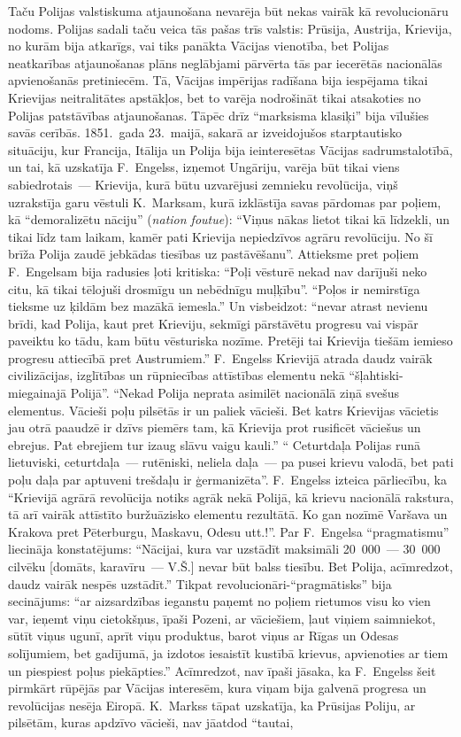 \documentclass[twoside,a5paper,12pt,fleqn,openany]{extbook}
\newcommand{\frtxti}[1]{\textit{\textfrench{#1}}}
\begin{document}
Taču Polijas valstiskuma atjaunošana nevarēja būt nekas vairāk kā revolucionāru nodoms. Polijas sadali taču veica tās pašas trīs valstis: Prūsija, Austrija, Krievija, no kurām bija atkarīgs, vai tiks panākta Vācijas vienotība, bet Polijas neatkarības atjaunošanas plāns neglābjami pārvērta tās par iecerētās nacionālās apvienošanās pretiniecēm. Tā, Vācijas impērijas radīšana bija iespējama tikai Krievijas neitralitātes apstākļos, bet to varēja nodrošināt tikai atsakoties no Polijas patstāvības atjaunošanas. Tāpēc drīz ``marksisma klasiķi'' bija vīlušies savās cerībās. 1851.~gada 23.~maijā, sakarā ar izveidojušos starptautisko situāciju, kur Francija, Itālija un Polija bija ieinteresētas Vācijas sadrumstalotībā, un tai, kā uzskatīja F.~Engelss, izņemot Ungāriju, varēja būt tikai viens sabiedrotais~--- Krievija, kurā būtu uzvarējusi zemnieku revolūcija, viņš uzrakstīja garu vēstuli K.~Marksam, kurā izklāstīja savas pārdomas par poļiem, kā ``demoralizētu nāciju'' (\frtxti{nation foutue}): ``Viņus nākas lietot tikai kā līdzekli, un tikai līdz tam laikam, kamēr pati Krievija nepiedzīvos agrāru revolūciju. No šī brīža Polija zaudē jebkādas tiesības uz pastāvēšanu''. Attieksme pret poļiem F.~Engelsam bija radusies ļoti kritiska: ``Poļi vēsturē nekad nav darījuši neko citu, kā tikai tēlojuši drosmīgu un nebēdnīgu muļķību''. ``Poļos ir nemirstīga tieksme uz ķildām bez mazākā iemesla.'' Un visbeidzot: ``nevar atrast nevienu brīdi, kad Polija, kaut pret Krieviju, sekmīgi pārstāvētu progresu vai vispār paveiktu ko tādu, kam būtu vēsturiska nozīme. Pretēji tai Krievija tiešām iemieso progresu attiecībā pret Austrumiem.'' F.~Engelss Krievijā atrada daudz vairāk civilizācijas, izglītības un rūpniecības attīstības elementu nekā ``šļahtiski-miegainajā Polijā''. ``Nekad Polija neprata asimilēt nacionālā ziņā svešus elementus. Vācieši poļu pilsētās ir un paliek vācieši. Bet katrs Krievijas vācietis jau otrā paaudzē ir dzīvs piemērs tam, kā Krievija prot rusificēt vāciešus un ebrejus. Pat ebrejiem tur izaug slāvu vaigu kauli.'' `` Ceturtdaļa Polijas runā lietuviski, ceturtdaļa~--- rutēniski, neliela daļa~--- pa pusei krievu valodā, bet pati poļu daļa par aptuveni trešdaļu ir ģermanizēta''. F.~Engelss izteica pārliecību, ka ``Krievijā agrārā revolūcija notiks agrāk nekā Polijā, kā krievu nacionālā rakstura, tā arī vairāk attīstīto buržuāzisko elementu rezultātā. Ko gan nozīmē Varšava un Krakova pret Pēterburgu, Maskavu, Odesu utt.!''. Par F.~Engelsa ``pragmatismu'' liecināja konstatējums: ``Nācijai, kura var uzstādīt maksimāli 20~000~--- 30~000 cilvēku [domāts, karavīru~--- V.Š.] nevar būt balss tiesību. Bet Polija, acīmredzot, daudz vairāk nespēs uzstādīt.'' Tikpat revolucionāri-``pragmātisks'' bija secinājums: ``ar aizsardzības ieganstu paņemt no poļiem rietumos visu ko vien var, ieņemt viņu cietokšņus, īpaši Pozeni, ar vāciešiem, ļaut viņiem saimniekot, sūtīt viņus ugunī, aprīt viņu produktus, barot viņus ar Rīgas un Odesas solījumiem, bet gadījumā, ja izdotos iesaistīt kustībā krievus, apvienoties ar tiem un piespiest poļus piekāpties.'' Acīmredzot, nav īpaši jāsaka, ka F.~Engelss šeit pirmkārt rūpējās par Vācijas interesēm, kura viņam bija galvenā progresa un revolūcijas nesēja Eiropā. K.~Markss tāpat uzskatīja, ka Prūsijas Poliju, ar pilsētām, kuras apdzīvo vācieši, nav jāatdod ``tautai, 
\end{document}
